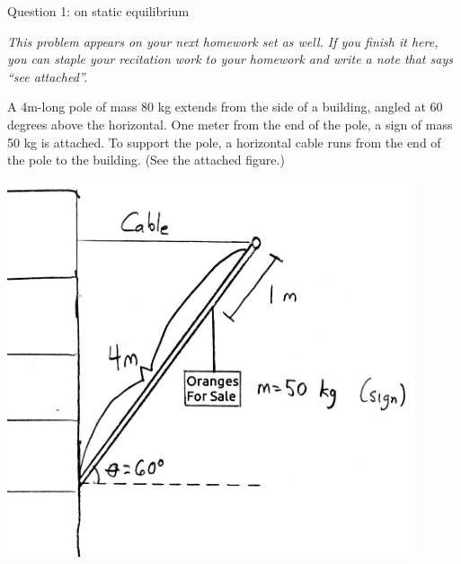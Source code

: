 \documentclass[12pt]{article}
\begin{document}
\vspace{1in}
\centerline{\large Question 1: on static equilibrium}

\begin{center}
\it \normalsize This problem appears on your next homework set as well. If you finish it here, you can staple your recitation work to your homework and write a note that says ``see attached''.
\end{center}

\begin{minipage}[b]{0.4\textwidth}
  \vspace{-0.8in}

A 4m-long pole of mass 80 kg extends from the side of a building, angled at 60 degrees above the horizontal. One meter from the end of the pole, a sign of mass 50 kg is attached. To support the pole,
a horizontal cable runs from the end of the pole to the building. (See the attached figure.)

\bigskip
\bigskip
\bigskip
\bigskip
\bigskip
\bigskip

\end{minipage}
\begin{minipage}[t]{0.6\textwidth}
  \begin{flushright}
  \includegraphics[width=0.9\textwidth]{sign2.jpg}
\end{flushright}
\end{minipage}

\bigskip
\bigskip

\newpage
\end{document}

